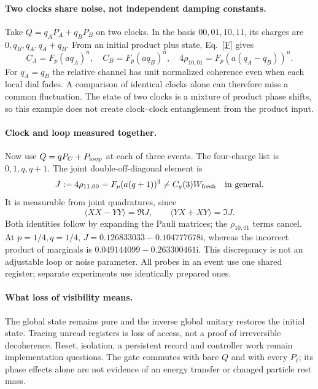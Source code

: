 \documentclass[11pt,a4paper]{article}
\newcommand{\ii}{\mathrm i}
\begin{document}
\paragraph{Two clocks share noise, not independent damping constants.}
Take $Q=q_A P_A+q_B P_B$ on two clocks. In the basis
$00,01,10,11$, its charges are $0,q_B,q_A,q_A+q_B$. From an initial
product plus state, Eq.~\eqref{F} gives
\begin{equation}
 C_A=F_p(aq_A)^n,\quad C_B=F_p(aq_B)^n,\quad
 4\rho_{10,01}=F_p(a(q_A-q_B))^n.\label{relative}
\end{equation}
For $q_A=q_B$ the relative channel has unit normalized coherence even
when each local dial fades. A comparison of identical clocks alone
can therefore miss a common fluctuation. The state of two clocks is a
mixture of product phase shifts, so this example does not create
clock--clock entanglement from the product input.

\paragraph{Clock and loop measured together.}
Now use $Q=qP_C+P_{\rm loop}$ at each of three events. The four-charge
list is $0,1,q,q+1$. The joint double-off-diagonal element is
\begin{equation}
 J:=4\rho_{11,00}=F_p(a(q+1))^3
 \ne C_q(3)W_{\rm fresh}\quad\hbox{in general}.\label{joint}
\end{equation}
It is measurable from joint quadratures, since
\begin{equation}
 \langle XX-YY\rangle=\Re J,\qquad
 \langle YX+XY\rangle=\Im J.
\end{equation}
Both identities follow by expanding the Pauli matrices; the
$\rho_{10,01}$ terms cancel. At $p=1/4,q=1/4$,
$J=0.126833033-0.104777678\ii$, whereas the incorrect product of
marginals is $0.049144099-0.263300461\ii$.
This discrepancy is not an adjustable loop or noise parameter.
All probes in an event use one shared register; separate experiments
use identically prepared ones.

\paragraph{What loss of visibility means.}
The global state remains pure and the inverse global unitary restores
the initial state. Tracing unread registers is loss of access, not a
proof of irreversible decoherence. Reset, isolation, a persistent record
and controller work remain implementation questions. The gate commutes
with bare $Q$ and with every $P_\ell$; its phase effects alone are not
evidence of an energy transfer or changed particle rest mass.
\end{document}

